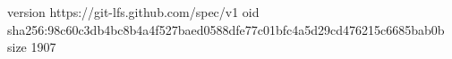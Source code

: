 version https://git-lfs.github.com/spec/v1
oid sha256:98c60c3db4bc8b4a4f527baed0588dfe77c01bfc4a5d29cd476215c6685bab0b
size 1907
